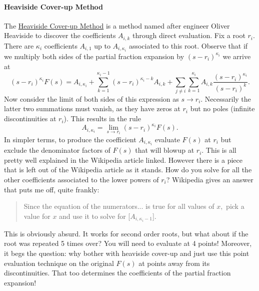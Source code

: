 \paragraph{Heaviside Cover-up Method}
The \href{https://en.wikipedia.org/wiki/Heaviside_cover-up_method}{Heaviside Cover-up Method} is a method named after engineer Oliver Heaviside to discover the coefficients \(A_{i, k}\) through direct evaluation.
Fix a root \(r_i.\)
There are \(\kappa_i\) coefficients \(A_{i, 1}\) up to \(A_{i, \kappa_i}\) associated to this root.
Observe that if we multiply both sides of the partial fraction expansion by \((s - r_i)^{\kappa_i}\) we arrive at
\[
  (s - r_i)^{\kappa_i} F(s)
    =
    A_{i, \kappa_i}
    +
    \sum_{k=1}^{\kappa_i - 1} (s - r_i)^{\kappa_i - k} A_{i, k}
    +
    \sum_{j\neq i} \sum_{k = 1}^{\kappa_i} A_{i, k} \frac{(s - r_i)^{\kappa_i}}{(s - r_i)^k}.
\]
Now consider the limit of both sides of this expression as \(s\to r_i.\)
Necessarily the latter two summations must vanish, as they have zeros at \(r_i\) but no poles (infinite discontinuities at \(r_i\)).
This results in the rule
\[
  A_{i, \kappa_i} = \lim_{s \to r_i} (s - r_i)^{\kappa_i} F(s).
\]
In simpler terms, to produce the coefficient \(A_{i, \kappa_i}\) evaluate \(F(s)\) at \(r_i\) but exclude the denominator factors of \(F(s)\) that will blowup at \(r_i.\)
This is all pretty well explained in the Wikipedia article linked.
However there is a piece that is left out of the Wikipedia article as it stands.
How do you solve for all the other coefficients associated to the lower powers of \(r_i\)?
Wikipedia gives an answer that puts me off, quite frankly:
\begin{quote}
  Since the equation of the numerators... is true for all values of \(x,\) pick a value for \(x\) and use it to solve for [\(A_{i, \kappa_i - 1}\)].
\end{quote}
This is obviously absurd. 
It works for second order roots, but what about if the root was repeated 5 times over?
You will need to evaluate at 4 points!
Moreover, it begs the question: why bother with heaviside cover-up and just use this point evaluation technique on the original \(F(s)\) at points away from its discontinuities.
That too determines the coefficients of the partial fraction expansion!

